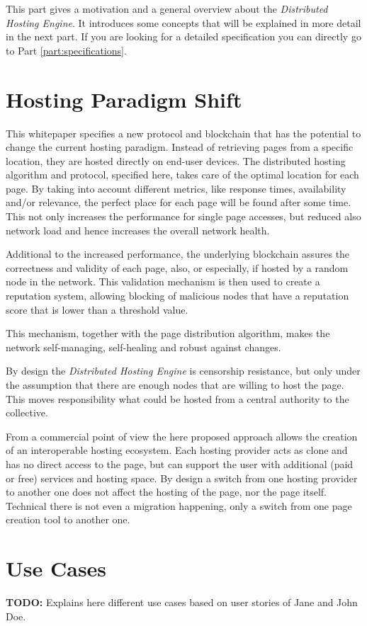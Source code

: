 
This part gives a motivation and a general overview about the
\textit{Distributed Hosting Engine}. It introduces some concepts that will be
explained in more detail in the next part. If you are looking for a detailed specification you can directly go to Part \ref{part:specifications}.

\section{Hosting Paradigm Shift}

This whitepaper specifies a new protocol and blockchain that has
the potential to change the current hosting paradigm. Instead of retrieving
pages from a specific location, they are hosted directly on end-user
devices. The distributed hosting algorithm and protocol, specified here, takes
care of the optimal location for each page. By taking into account different
metrics, like response times, availability and/or relevance, the perfect place
for each page will be found after some time. This not only increases the
performance for single page accesses, but reduced also network load and hence
increases the overall network health.

Additional to the increased performance, the underlying blockchain assures the
correctness and validity of each page, also, or especially, if hosted by a
random node in the network. This validation mechanism is then used to create a
reputation system, allowing blocking of malicious nodes that have a reputation
score that is lower than a threshold value.

This mechanism, together with the page distribution algorithm, makes the
network self-managing, self-healing and robust against changes.

By design the \textit{Distributed Hosting Engine} is censorship resistance,
but only under the assumption that there are enough nodes that are willing to
host the page. This moves responsibility what could be hosted from a central
authority to the collective.

From a commercial point of view the here proposed approach allows the creation
of an interoperable hosting ecosystem. Each hosting provider acts as clone and
has no direct access to the page, but can support the user with additional
(paid or free) services and hosting space. By design a switch from one
hosting provider to another one does not affect the hosting of the page, nor
the page itself. Technical there is not even a migration happening, only a
switch from one page creation tool to another one.

\section{Use Cases}

\textbf{TODO:} Explains here different use cases based on user stories of Jane
and John Doe.
